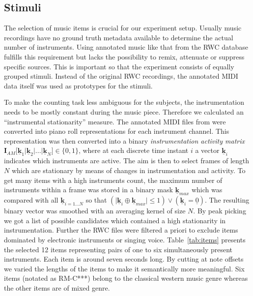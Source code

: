 \subsection{Stimuli}

The selection of music items is crucial for our experiment setup. Usually music recordings have no ground truth metadata available to determine the actual number of instruments. Using annotated music like that from the RWC database~\cite{rwc} fulfills this requirement but lacks the possibility to remix, attenuate or suppress specific sources. This is important so that the experiment consists of equally grouped stimuli. Instead of the original RWC recordings, the annotated MIDI data itself was used as prototypes for the stimuli.

To make the counting task less ambiguous for the subjects, the instrumentation needs to be mostly constant during the music piece. Therefore we calculated an ``instrumental stationarity'' measure. The annotated MIDI files from \cite{rwc} were converted into piano roll representations for each instrument channel. This representation was then converted into a binary \emph{instrumentation activity matrix} $\mathbf{I}_{AM}\lbrack \mathbf{\underline{k}}_1 \vert \mathbf{\underline{k}}_2 \vert  ... \vert \mathbf{\underline{k}}_N \rbrack \in \{0,1\}$, where at each discrete time instant $i$ a vector $\mathbf{\underline{k}}_i$ indicates which instruments are active. The aim is then to select frames of length $N$ which are stationary by means of changes in instrumentation and activity. To get many items with a high instruments count, the maximum number of instruments within a frame was stored in a binary mask $\mathbf{\underline{k}}_{max}$ which was compared with all $\mathbf{\underline{k}}_{i=1...N}$ so that $(\vert\mathbf{\underline{k}}_{i} \oplus \mathbf{\underline{k}}_{max}\vert \leq 1) \lor (\mathbf{\underline{k}}_{i} = \underline{0})$. The resulting binary vector was smoothed with an averaging kernel of size $N$. By peak picking we got a list of possible candidates which contained a high stationarity in instrumentation.
Further the RWC files were filtered a priori to exclude items dominated by electronic instruments or singing voice. Table~\ref{tab:items} presents the selected 12 items representing pairs of one to six simultaneously present instruments. Each item is around seven seconds long. By cutting at note offsets we varied the lengths of the items to make it semantically more meaningful. Six items (notated as RM-C***) belong to the classical western music genre whereas the other items are of mixed genre.

